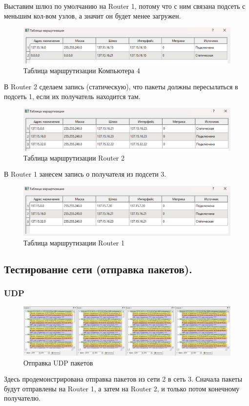 \documentclass[12pt,onecolumn]{article}
\begin{document}
Выставим шлюз по умолчанию на Router 1, потому что с ним связана подсеть с
меньшим кол-вом узлов, а значит он будет менее загружен.

\begin{figure}[H]
    \centering
    \includegraphics[width=\textwidth]{image/part-2/routing-computer4.png}
    \caption{Таблица маршрутизации Компьютера 4}
\end{figure}

В Router 2 сделаем запись (статическую), что пакеты должны пересылаться в подсеть 1, если их получатель находится там.
\begin{figure}[H]
    \centering
    \includegraphics[width=\textwidth]{image/part-2/router2-routing.png}
    \caption{Таблица маршрутизации Router 2}
\end{figure}

В Router 1 занесем запись о получателя из подсети 3.
\begin{figure}[H]
    \centering
    \includegraphics[width=\textwidth]{image/part-2/router1-routing.png}
    \caption{Таблица маршрутизации Router 1}
\end{figure}
\subsection{Тестирование сети (отправка пакетов).}
\subsubsection{UDP}
\begin{figure}[H]
    \centering
    \includegraphics[width=\textwidth]{image/part-2/udp.png}
    \caption{Отправка UDP пакетов}
\end{figure}
Здесь продемонстрирована отправка пакетов из сети 2 в сеть 3.
Сначала пакеты будут отправлены на Router 1, а затем на Router 2, и только потом конечному получателю.
\end{document}
